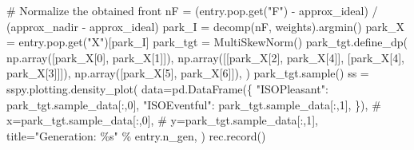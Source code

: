 \documentclass[
  authoryear,
  preprint,
  3p]{elsarticle}
\newenvironment{Shaded}{\begin{snugshade}}{\end{snugshade}}
\newcommand{\CommentTok}[1]{\textcolor[rgb]{0.37,0.37,0.37}{#1}}
\newcommand{\DecValTok}[1]{\textcolor[rgb]{0.68,0.00,0.00}{#1}}
\newcommand{\NormalTok}[1]{\textcolor[rgb]{0.00,0.23,0.31}{#1}}
\newcommand{\OperatorTok}[1]{\textcolor[rgb]{0.37,0.37,0.37}{#1}}
\newcommand{\SpecialCharTok}[1]{\textcolor[rgb]{0.37,0.37,0.37}{#1}}
\newcommand{\StringTok}[1]{\textcolor[rgb]{0.13,0.47,0.30}{#1}}
\begin{document}
\begin{Shaded}
\begin{Highlighting}[]
        \CommentTok{\# Normalize the obtained front}
\NormalTok{        nF }\OperatorTok{=}\NormalTok{ (entry.pop.get(}\StringTok{"F"}\NormalTok{) }\OperatorTok{{-}}\NormalTok{ approx\_ideal) }\OperatorTok{/}\NormalTok{ (approx\_nadir }\OperatorTok{{-}}\NormalTok{ approx\_ideal)}
\NormalTok{        park\_I }\OperatorTok{=}\NormalTok{ decomp(nF, weights).argmin()}
\NormalTok{        park\_X }\OperatorTok{=}\NormalTok{ entry.pop.get(}\StringTok{"X"}\NormalTok{)[park\_I]}
\NormalTok{        park\_tgt }\OperatorTok{=}\NormalTok{ MultiSkewNorm()}
\NormalTok{        park\_tgt.define\_dp(}
\NormalTok{            np.array([park\_X[}\DecValTok{0}\NormalTok{], park\_X[}\DecValTok{1}\NormalTok{]]),}
\NormalTok{            np.array([[park\_X[}\DecValTok{2}\NormalTok{], park\_X[}\DecValTok{4}\NormalTok{]], [park\_X[}\DecValTok{4}\NormalTok{], park\_X[}\DecValTok{3}\NormalTok{]]]),}
\NormalTok{            np.array([park\_X[}\DecValTok{5}\NormalTok{], park\_X[}\DecValTok{6}\NormalTok{]]),}
\NormalTok{        )}
\NormalTok{        park\_tgt.sample()}
\NormalTok{        ss }\OperatorTok{=}\NormalTok{ sspy.plotting.density\_plot(}
\NormalTok{            data}\OperatorTok{=}\NormalTok{pd.DataFrame(\{}
                \StringTok{"ISOPleasant"}\NormalTok{: park\_tgt.sample\_data[:,}\DecValTok{0}\NormalTok{],}
                \StringTok{"ISOEventful"}\NormalTok{: park\_tgt.sample\_data[:,}\DecValTok{1}\NormalTok{],}
\NormalTok{            \}),}
            \CommentTok{\# x=park\_tgt.sample\_data[:,0],}
            \CommentTok{\# y=park\_tgt.sample\_data[:,1],}
\NormalTok{            title}\OperatorTok{=}\StringTok{"Generation: }\SpecialCharTok{\%s}\StringTok{"} \OperatorTok{\%}\NormalTok{ entry.n\_gen,}
\NormalTok{        )}
\NormalTok{        rec.record()}
\end{Highlighting}
\end{Shaded}
\end{document}

